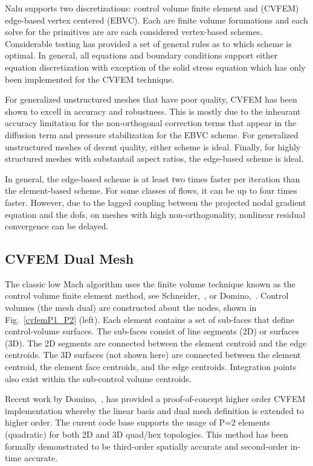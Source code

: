 Nalu supports two discretizations: control volume finite element
and (CVFEM) edge-based vertex centered (EBVC). Each are finite volume forumations
and each solve for the primitives are are each considered vertex-based
schemes. Considerable testing has provided a set of general rules as to which
scheme is optimal. In general, all equations and boundary conditions
support either equation discretization with exception of the solid stress equation
which has only been implemented for the CVFEM technique.

For generalized unstructured meshes that have poor quality,
CVFEM has been shown to excell in accuracy and robustness. This is mostly
due to the inhearant accuracy limitation for the non-orthogonal
correction terms that appear in the diffusion term and pressure
stabilization for the EBVC scheme. For generalized unstructured meshes of decent quality, either 
scheme is ideal. Finally, for highly structured meshes with substantail aspect 
ratios, the edge-based scheme is ideal.

In general, the edge-based scheme is at least two times faster per iteration 
than the element-based scheme. For some classes of flows, it can be up
to four times faster. However, due to the lagged coupling between the projected
nodal gradient equation and the dofs, on meshes with high non-orthogonality,
nonlinear residual convergence can be delayed.

\subsection{CVFEM Dual Mesh}

The classic low Mach algorithm uses the finite volume technique known
as the control volume finite element method, see Schneider,~\cite{Schneider:1987}, or 
Domino,~\cite{Domino:2006}. Control volumes 
(the mesh dual) are constructed about the nodes, shown in Fig.~\ref{cvfemP1_P2} (left).
Each element contains a set of sub-faces that define control-volume surfaces.
The sub-faces consist of line segments (2D) or surfaces (3D).
The 2D segments are connected between the element centroid
and the edge centroids. The 3D surfaces (not shown here) are connected between
the element centroid, the element face centroids, and the
edge centroids. Integration points also exist within the sub-control
volume centroids. 

Recent work by Domino,~\cite{Domino:2014}, has provided a proof-of-concept higher order CVFEM implementation 
whereby the linear basis and dual mesh definition is extended to higher order. The curent code base supports
the usage of P=2 elements (quadratic) for both 2D and 3D quad/hex topologies. This method has been formally 
demonstrated to be third-order spatially accurate and second-order in-time accurate.

